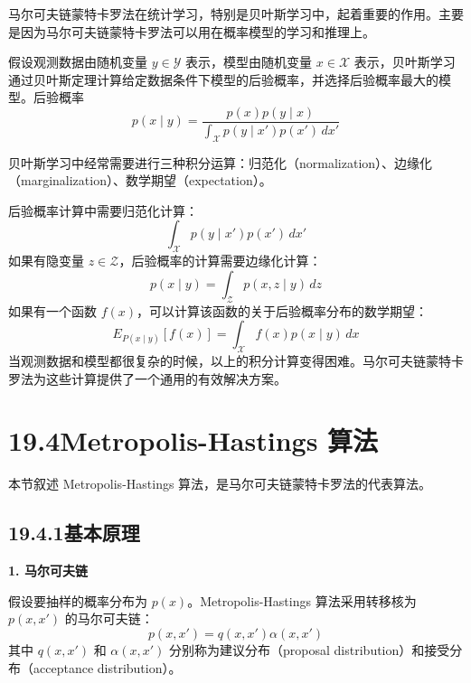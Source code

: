 \documentclass[UTF8,12pt,a4paper,fontset=fandol]{ctexart}
\begin{document}
马尔可夫链蒙特卡罗法在统计学习，特别是贝叶斯学习中，起着重要的作用。主要是因为马尔可夫链蒙特卡罗法可以用在概率模型的学习和推理上。

假设观测数据由随机变量 $y\in\mathcal{Y}$ 表示，模型由随机变量 $x\in\mathcal{X}$ 表示，贝叶斯学习通过贝叶斯定理计算给定数据条件下模型的后验概率，并选择后验概率最大的模型。后验概率
\begin{equation}
p(x\mid y)=\frac{p(x)p(y\mid x)}{\displaystyle\int_{\mathcal{X}}p(y\mid x')p(x')\,dx'}
\tag{19.34}
\end{equation}

贝叶斯学习中经常需要进行三种积分运算：归范化（normalization）、边缘化（marginalization）、数学期望（expectation）。

后验概率计算中需要归范化计算：
\begin{equation}
\int_{\mathcal{X}}p(y\mid x')p(x')\,dx'
\tag{19.35}
\end{equation}
如果有隐变量 $z\in\mathcal{Z}$，后验概率的计算需要边缘化计算：
\begin{equation}
p(x\mid y)=\int_{\mathcal{Z}}p(x,z\mid y)\,dz
\tag{19.36}
\end{equation}
如果有一个函数 $f(x)$，可以计算该函数的关于后验概率分布的数学期望：
\begin{equation}
E_{P(x\mid y)}[f(x)]=\int_{\mathcal{X}}f(x)p(x\mid y)\,dx
\tag{19.37}
\end{equation}
当观测数据和模型都很复杂的时候，以上的积分计算变得困难。马尔可夫链蒙特卡罗法为这些计算提供了一个通用的有效解决方案。

\section*{19.4\quad Metropolis-Hastings 算法}

本节叙述 Metropolis-Hastings 算法，是马尔可夫链蒙特卡罗法的代表算法。

\subsection*{19.4.1\quad 基本原理}

\noindent\textbf{1. 马尔可夫链}

假设要抽样的概率分布为 $p(x)$。Metropolis-Hastings 算法采用转移核为 $p(x,x')$ 的马尔可夫链：
\begin{equation}
p(x,x')=q(x,x')\alpha(x,x')
\tag{19.38}
\end{equation}
其中 $q(x,x')$ 和 $\alpha(x,x')$ 分别称为建议分布（proposal distribution）和接受分布（acceptance distribution）。
\end{document}
